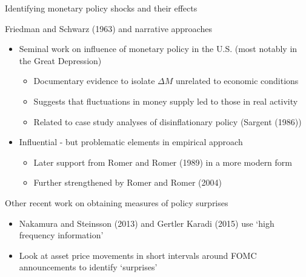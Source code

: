 \begin{frame}{Identifying monetary policy shocks and their effects}

Friedman and Schwarz (1963) and narrative approaches
\begin{itemize}
\item Seminal work on influence of monetary policy in the U.S. (most notably in the Great Depression)
	\begin{itemize}
	\item	Documentary evidence to isolate $\Delta M$ unrelated to economic conditions
	\item	Suggests that fluctuations in money supply led to those in real activity
	\item	Related to case study analyses of disinflationary policy (Sargent (1986))
	\end{itemize}
\item Influential - but problematic elements in empirical approach
	\begin{itemize}
	\item 	Later support from Romer and Romer (1989) in a more modern form
	\item	Further strengthened by Romer and Romer (2004)
	\end{itemize}
\end{itemize}

\vspace{2mm}
Other recent work on obtaining measures of policy surprises
\begin{itemize}
\item	Nakamura and Steinsson (2013) and Gertler Karadi (2015) use `high frequency information'
\item	Look at asset price movements in short intervals around FOMC announcements to identify `surprises'
\end{itemize}

\end{frame}



